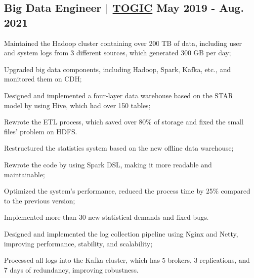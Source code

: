 \subsection{{Big Data Engineer | \href{http://www.51togic.com}{TOGIC} \hfill May 2019 - Aug. 2021}}
\begin{zitemize}
    \item Maintained the Hadoop cluster containing over 200 TB of data, including user and system logs from 3 different sources, which generated 300 GB per day;
    \item Upgraded big data components, including Hadoop, Spark, Kafka, etc., and monitored them on CDH;
    \item Designed and implemented a four-layer data warehouse based on the STAR model by using Hive, which had over 150 tables;
    \item Rewrote the ETL process, which saved over 80\% of storage and fixed the small files' problem on HDFS.
\end{zitemize}
\begin{zitemize}
    \item Restructured the statistics system based on the new offline data warehouse;
    \item Rewrote the code by using Spark DSL, making it more readable and maintainable;
    \item Optimized the system's performance, reduced the process time by 25\% compared to the previous version;
    \item Implemented more than 30 new statistical demands and fixed bugs.
\end{zitemize}
\begin{zitemize}
    \item Designed and implemented the log collection pipeline using Nginx and Netty, improving performance, stability, and scalability;
    \item Processed all logs into the Kafka cluster, which has 5 brokers, 3 replications, and 7 days of redundancy, improving robustness.
\end{zitemize}



